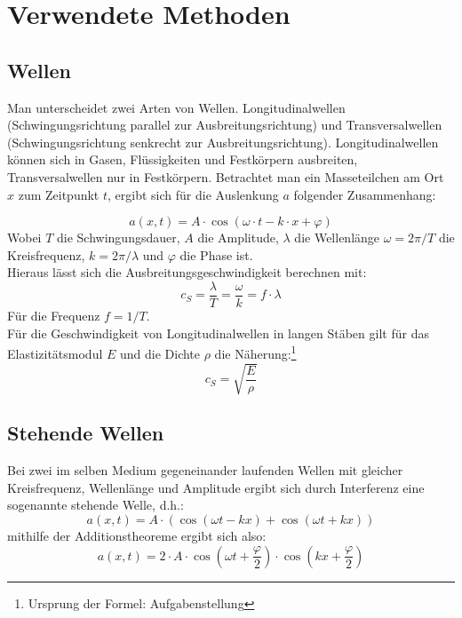 \section{Verwendete Methoden}
\subsection{Wellen}
Man unterscheidet zwei Arten von Wellen. Longitudinalwellen (Schwingungsrichtung parallel zur Ausbreitungsrichtung) und Transversalwellen (Schwingungsrichtung senkrecht zur Ausbreitungsrichtung). Longitudinalwellen können sich in Gasen, Flüssigkeiten und Festkörpern ausbreiten, Transversalwellen nur in Festkörpern. Betrachtet man ein Masseteilchen am Ort $x$ zum Zeitpunkt $t$, ergibt sich für die Auslenkung $a$ folgender Zusammenhang:

\begin{equation}
a(x, t) = A \cdot \cos (\omega \cdot t - k \cdot x + \varphi)
\label{eq.wave}
\end{equation}
Wobei $T$ die Schwingungsdauer, $A$ die Amplitude, $\lambda$ die Wellenlänge $\omega = 2\pi /T$ die Kreisfrequenz, $k = 2\pi /\lambda$ und $\varphi$ die Phase ist.\\
Hieraus lässt sich die Ausbreitungsgeschwindigkeit berechnen mit:
\begin{equation}
c_S = \frac{\lambda}{T} = \frac{\omega}{k} = f \cdot \lambda
\label{eq:speed}
\end{equation}
Für die Frequenz $f = 1/T$.\\
Für die Geschwindigkeit von Longitudinalwellen in langen Stäben gilt für das Elastizitätsmodul $E$ und die Dichte $\rho$ die Näherung:\footnote{Ursprung der Formel: Aufgabenstellung}
\begin{equation}
c_S = \sqrt{\frac{E}{\rho}}
\label{eq:elast}
\end{equation}
\subsection{Stehende Wellen}
Bei zwei im selben Medium gegeneinander laufenden Wellen mit gleicher Kreisfrequenz, Wellenlänge und Amplitude ergibt sich durch Interferenz eine sogenannte stehende Welle, d.h.:
\begin{equation*}
a(x, t) = A \cdot (\cos (\omega t - kx) + \cos (\omega t + kx))
\end{equation*}
mithilfe der Additionstheoreme ergibt sich also:
\begin{equation}
a(x, t) = 2 \cdot A \cdot \cos \left(\omega t + \frac{\varphi}{2}\right)\cdot \cos \left(kx + \frac{\varphi}{2}\right)
\label{eq:standingWave}
\end{equation}

